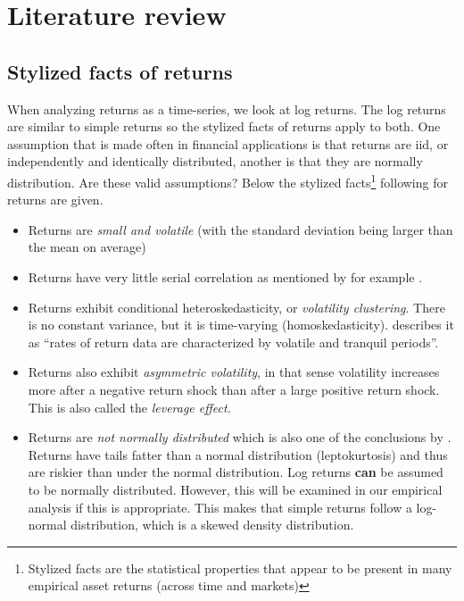 \documentclass[a4paper, twoside]{templates/ociamthesis}
\begin{document}
\hypertarget{lit-rev}{%
\chapter{Literature review}\label{lit-rev}}

\minitoc 

\hypertarget{stylized-facts-of-returns}{%
\section{Stylized facts of returns}\label{stylized-facts-of-returns}}

When analyzing returns as a time-series, we look at log returns. The log returns are similar to simple returns so the stylized facts of returns apply to both. One assumption that is made often in financial applications is that returns are iid, or independently and identically distributed, another is that they are normally distribution. Are these valid assumptions? Below the stylized facts\footnote{Stylized facts are the statistical properties that appear to be present in many empirical asset returns (across time and markets)} following \textcite{annaert2021} for returns are given.

\begin{itemize}
\item
  Returns are \emph{small and volatile} (with the standard deviation being larger than the mean on average)
\item
  Returns have very little serial correlation as mentioned by for example \textcite{bollerslev1987}.
\item
  Returns exhibit conditional heteroskedasticity, or \emph{volatility clustering}. There is no constant variance, but it is time-varying (homoskedasticity). \textcite{bollerslev1987} describes it as ``rates of return data are characterized by volatile and tranquil periods''.
\item
  Returns also exhibit \emph{asymmetric volatility}, in that sense volatility increases more after a negative return shock than after a large positive return shock. This is also called the \emph{leverage effect.}
\item
  Returns are \emph{not normally distributed} which is also one of the conclusions by \textcite{fama1965}. Returns have tails fatter than a normal distribution (leptokurtosis) and thus are riskier than under the normal distribution. Log returns \textbf{can} be assumed to be normally distributed. However, this will be examined in our empirical analysis if this is appropriate. This makes that simple returns follow a log-normal distribution, which is a skewed density distribution.
\end{itemize}
\end{document}
